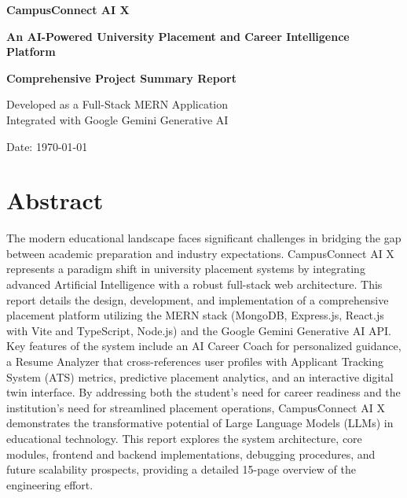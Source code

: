 \documentclass[12pt,a4paper]{report}
\begin{document}
\begin{titlepage}
    \begin{center}
        \vspace*{2cm}
        
        \Huge
        \textbf{CampusConnect AI X}
        
        \vspace{1.5cm}
        \Large
        \textbf{An AI-Powered University Placement and Career Intelligence Platform}
        
        \vspace{2cm}
        
        \textbf{Comprehensive Project Summary Report}
        
        \vspace{2cm}
        
        \large
        Developed as a Full-Stack MERN Application\\
        Integrated with Google Gemini Generative AI
        
        \vfill
        
        \vspace{0.8cm}
        \Large
        Date: \today
        
    \end{center}
\end{titlepage}


\chapter*{Abstract}
The modern educational landscape faces significant challenges in bridging the gap between academic preparation and industry expectations. CampusConnect AI X represents a paradigm shift in university placement systems by integrating advanced Artificial Intelligence with a robust full-stack web architecture. This report details the design, development, and implementation of a comprehensive placement platform utilizing the MERN stack (MongoDB, Express.js, React.js with Vite and TypeScript, Node.js) and the Google Gemini Generative AI API. Key features of the system include an AI Career Coach for personalized guidance, a Resume Analyzer that cross-references user profiles with Applicant Tracking System (ATS) metrics, predictive placement analytics, and an interactive digital twin interface. By addressing both the student's need for career readiness and the institution's need for streamlined placement operations, CampusConnect AI X demonstrates the transformative potential of Large Language Models (LLMs) in educational technology. This report explores the system architecture, core modules, frontend and backend implementations, debugging procedures, and future scalability prospects, providing a detailed 15-page overview of the engineering effort.
\end{document}
